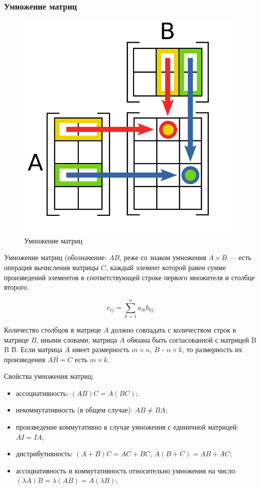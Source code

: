 \documentclass{article}
\begin{document}
\subsubsection*{Умножение матриц}
\begin{figure}
  \includegraphics[width=0.6\linewidth]{matrix-multiplication.png}
  \caption{Умножение матриц}
\end{figure}
Умножение матриц (обозначение: $AB$, реже со знаком умножения $A\times B$ — есть операция вычисления матрицы $C$,
каждый элемент которой равен сумме произведений элементов в соответствующей строке первого множителя и столбце второго.

$$c_{ij}=\sum _{k=1}^{n}a_{ik}b_{kj}$$

Количество столбцов в матрице $A$ должно совпадать с количеством строк в матрице $B$, иными словами, 
матрица $A$ обязана быть согласованной с матрицей B {\displaystyle B} B. 
Если матрица $A$ имеет размерность $m\times n$, $B$ - $ n\times k$, 
то размерность их произведения $AB=C$ есть $m\times k$.

Свойства умножения матриц:

\begin{itemize}
    \item ассоциативность: $(AB)C = A(BC)$;
    \item некоммутативность (в общем случае): $AB \neq BA$;
    \item произведение коммутативно в случае умножения с единичной матрицей: $AI = IA$;
    \item дистрибутивность: $(A+B)C = AC + BC$, $A(B+C) = AB + AC$;
    \item ассоциативность и коммутативность относительно умножения на число: $(\lambda A)B = \lambda (AB) = A(\lambda B)$;
\end{itemize}
\end{document}
